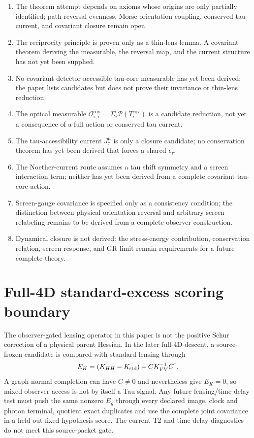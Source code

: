 \documentclass[11pt]{article}
\begin{document}
\begin{enumerate}
  remains invariant, and what detector-accessible quantity carries the
  tau-core correction.
\item
  The theorem attempt depends on axioms whose origins are only partially
  identified; path-reversal evenness, Morse-orientation coupling,
  conserved tau current, and covariant closure remain open.
\item
  The reciprocity principle is proven only as a thin-lens lemma. A
  covariant theorem deriving the measurable, the reversal map, and the
  current structure has not yet been supplied.
\item
  No covariant detector-accessible tau-core measurable has yet been
  derived; the paper lists candidates but does not prove their
  invariance or thin-lens reduction.
\item
  The optical measurable
  \(\mathcal{O}_{\tau,i}^\mathrm{cov}=\Sigma_i\mathcal{P}(T_i^\mathrm{cov})\)
  is a candidate reduction, not yet a consequence of a full action or
  conserved tau current.
\item
  The tau-accessibility current \(J^\mu_\tau\) is only a closure
  candidate; no conservation theorem has yet been derived that forces a
  shared \(\epsilon_\tau\).
\item
  The Noether-current route assumes a tau shift symmetry and a screen
  interaction term; neither has yet been derived from a complete
  covariant tau-core action.
\item
  Screen-gauge covariance is specified only as a consistency condition;
  the distinction between physical orientation reversal and arbitrary
  screen relabeling remains to be derived from a complete observer
  construction.
\item
  Dynamical closure is not derived: the stress-energy contribution,
  conservation relation, screen response, and GR limit remain
  requirements for a future complete theory.
\end{enumerate}

\section{Full-4D standard-excess scoring boundary}

The observer-gated lensing operator in this paper is not the positive Schur
correction of a physical parent Hessian.  In the later full-4D descent, a
source-frozen candidate is compared with standard lensing through
\[
 E_K=(K_{HH}-K_{\rm std})-CK_{VV}^{-1}C^\dagger.
\]
A graph-normal completion can have \(C\neq0\) and nevertheless give
\(E_K=0\), so mixed observer access is not by itself a Tau signal.  Any future
lensing/time-delay test must push the same nonzero \(E_g\) through every
declared image, clock and photon terminal, quotient exact duplicates and use
the complete joint covariance in a held-out fixed-hypothesis score.  The
current T2 and time-delay diagnostics do not meet this source-packet gate.
\end{document}
